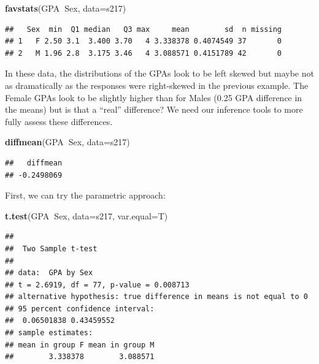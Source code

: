 \documentclass[]{book}
\newenvironment{Shaded}{\begin{snugshade}}{\end{snugshade}}
\newcommand{\KeywordTok}[1]{\textcolor[rgb]{0.13,0.29,0.53}{\textbf{#1}}}
\newcommand{\DataTypeTok}[1]{\textcolor[rgb]{0.13,0.29,0.53}{#1}}
\newcommand{\OperatorTok}[1]{\textcolor[rgb]{0.81,0.36,0.00}{\textbf{#1}}}
\newcommand{\NormalTok}[1]{#1}
\begin{document}
\begin{Shaded}
\begin{Highlighting}[]
\KeywordTok{favstats}\NormalTok{(GPA}\OperatorTok{~}\NormalTok{Sex, }\DataTypeTok{data=}\NormalTok{s217)}
\end{Highlighting}
\end{Shaded}

\begin{verbatim}
##   Sex  min  Q1 median   Q3 max     mean        sd  n missing
## 1   F 2.50 3.1  3.400 3.70   4 3.338378 0.4074549 37       0
## 2   M 1.96 2.8  3.175 3.46   4 3.088571 0.4151789 42       0
\end{verbatim}

In these data, the distributions of the GPAs look to be left skewed but
maybe not as dramatically as the responses were right-skewed in the
previous example. The Female GPAs look to be slightly higher than for
Males (0.25 GPA difference in the means) but is that a ``real''
difference? We need our inference tools to more fully assess these
differences.

\begin{Shaded}
\begin{Highlighting}[]
\KeywordTok{diffmean}\NormalTok{(GPA}\OperatorTok{~}\NormalTok{Sex, }\DataTypeTok{data=}\NormalTok{s217)}
\end{Highlighting}
\end{Shaded}

\begin{verbatim}
##   diffmean 
## -0.2498069
\end{verbatim}

First, we can try the parametric approach:

\begin{Shaded}
\begin{Highlighting}[]
\KeywordTok{t.test}\NormalTok{(GPA}\OperatorTok{~}\NormalTok{Sex, }\DataTypeTok{data=}\NormalTok{s217, }\DataTypeTok{var.equal=}\NormalTok{T)}
\end{Highlighting}
\end{Shaded}

\begin{verbatim}
## 
##  Two Sample t-test
## 
## data:  GPA by Sex
## t = 2.6919, df = 77, p-value = 0.008713
## alternative hypothesis: true difference in means is not equal to 0
## 95 percent confidence interval:
##  0.06501838 0.43459552
## sample estimates:
## mean in group F mean in group M 
##        3.338378        3.088571
\end{verbatim}
\end{document}
